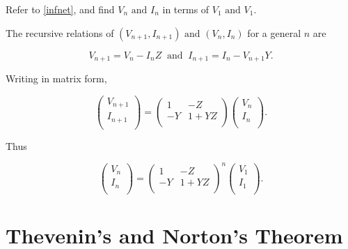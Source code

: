 \documentclass[english,a4paper,12pt]{report}
\begin{document}
{Refer to \cref{infnet}, and find \(V_{n} \text { and } I_{n}  \) in terms of \(V_1 \text { and } V_1 \).}
{The recursive relations of \((V_{n+1}, I_{n+1}) \text { and } (V_{n}, I_{n})\) for a general \(n\) are

\begin{equation}
    V_{n+1} = V_{n} - I_{n}Z ~\text { and }~ I_{n+1} = I_{n} - V_{n+1}Y.      
\end{equation}

Writing in matrix form,

\begin{equation}
    \begin{pmatrix}
         V_{n+1}  \\
         I_{n+1}  \\
    \end{pmatrix} = \begin{pmatrix}
        1 & -Z   \\
        -Y & 1+YZ  \\
    \end{pmatrix} \begin{pmatrix}
         V_{n}  \\
         I_{n}  \\
    \end{pmatrix}.
\end{equation}

Thus 

\begin{equation}
    \begin{pmatrix}
         V_{n}  \\
         I_{n}  \\
    \end{pmatrix} = \begin{pmatrix}
        1 & -Z  \\
        -Y & 1+YZ  \\
    \end{pmatrix}^{n} \begin{pmatrix}
        V_{1}  \\
        I_{1}  \\
   \end{pmatrix}.
\end{equation}



} 



\section{Thevenin's and Norton's Theorem}
\end{document}
